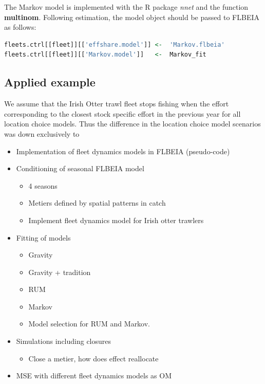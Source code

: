 \documentclass[12pt, halfline, a4paper]{ouparticle}
\begin{document}
The Markov model is implemented with the R package \textit{nnet} and the
function \textbf{multinom}. Following estimation, the model object should be
passed to FLBEIA as follows:

\begin{lstlisting}[language=R]
fleets.ctrl[[fleet]][['effshare.model']] <-  'Markov.flbeia'
fleets.ctrl[[fleet]][['Markov.model']]   <-  Markov_fit 
\end{lstlisting}



\subsection{Applied example}

We assume that the Irish Otter trawl fleet stops fishing when the effort
corresponding to the closest stock specific effort in the previous year for all
location choice models. Thus the difference in the location choice model
scenarios was down exclusively to  \\ 



\begin{itemize}
	\item Implementation of fleet dynamics models in FLBEIA (pseudo-code)
	\item Conditioning of seasonal FLBEIA model
		\begin{itemize}
			\item 4 seasons
			\item Metiers defined by spatial patterns in catch
			\item Implement fleet dynamics model for Irish otter
				trawlers
		\end{itemize}
	\item Fitting of models 
		\begin{itemize}
			\item Gravity
			\item Gravity + tradition
			\item RUM
			\item Markov 
			\item Model selection for RUM and Markov.
		\end{itemize}
	\item Simulations including closures
		\begin{itemize}
			\item Close a metier, how does effect reallocate
		\end{itemize}
	\item MSE with different fleet dynamics models as OM
\end{itemize}
\end{document}
